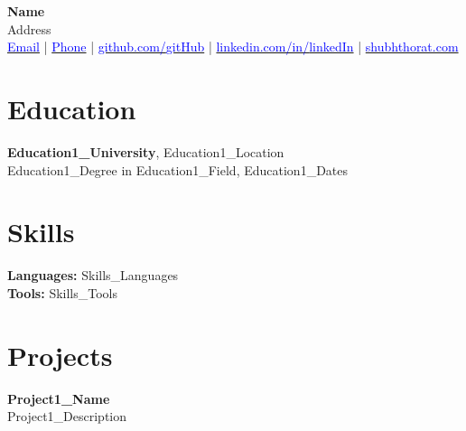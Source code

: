\documentclass[letterpaper,10pt]{article}
\begin{document}
\begin{center}
    {\Large \textbf{{{{Name}}}}} \\
    {\normalsize {{{Address}}}} \\
    \href{mailto:{{{{Email}}}}}{\textcolor{blue}{{{{Email}}}}} |
    \href{tel:{{{{Phone}}}}}{\textcolor{blue}{{{{Phone}}}}} |
    \href{https://github.com/{{{{gitHub}}}}}{\textcolor{blue}{github.com/{{{{gitHub}}}}}} |
    \href{https://linkedin.com/in/{{{{linkedIn}}}}}{\textcolor{blue}{linkedin.com/in/{{{{linkedIn}}}}}} |
    \href{https://shubhthorat.com}{\textcolor{blue}{shubhthorat.com}}
\end{center}

\section*{\large \textbf{Education}}
\textbf{{{{Education1_University}}}}, {{{Education1_Location}}} \\
{{{{Education1_Degree}}}} in {{{{Education1_Field}}}}, {{{Education1_Dates}}}

\section*{\large \textbf{Skills}}
\textbf{Languages:} {{{Skills_Languages}}} \\
\textbf{Tools:} {{{Skills_Tools}}}

\section*{\large \textbf{Projects}}
\textbf{{{{Project1_Name}}}} \\
{{{{Project1_Description}}}}
\end{document}
